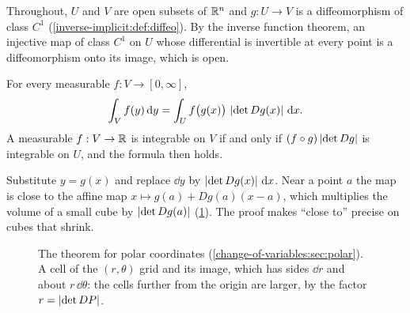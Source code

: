 \begin{notechapter}
Throughout, $U$ and $V$ are open subsets of $\mathbb{R}^n$ and $g:U\to V$ is a
diffeomorphism of class $C^1$ (\cref{inverse-implicit:def:diffeo}). By
the inverse function theorem, an injective map of class $C^1$ on $U$
whose differential is invertible at every point is a diffeomorphism
onto its image, which is open.

\begin{theorem}\label{change-of-variables:thm:cov}
For every measurable $f:V\to[0, \infty]$,
\[
  \int_Vf(y)\,\mathrm{d} y = \int_Uf\bigl(g(x)\bigr)\,\left|\det Dg(x)\right|\,\mathrm{d} x .
\]
A measurable $f:V\to\mathbb{R}$ is integrable on $V$ if and only if
$(f\circ g)\left|\det Dg\right|$ is integrable on $U$, and the formula then
holds.
\end{theorem}

\begin{intuition}
Substitute $y = g(x)$ and replace $\dd y$ by
$\left|\det Dg(x)\right|\,\mathrm{d} x$. Near a point $a$ the map is close to the
affine map $x\mapsto g(a) + Dg(a)(x - a)$, which multiplies the volume
of a small cube by $\left|\det Dg(a)\right|$
(\cref{change-of-variables:fig:polar}). The proof makes ``close to''
precise on cubes that shrink.
\end{intuition}

\begin{figure}[ht]
\centering
{}
\caption{The theorem for polar coordinates
(\cref{change-of-variables:sec:polar}). A cell of the $(r, \theta)$ grid
and its image, which has sides $\dd r$ and about $r\,\dd\theta$: the
cells further from the origin are larger, by the factor
$r = \left|\det DP\right|$.}
\label{change-of-variables:fig:polar}
\end{figure}


\end{notechapter}
